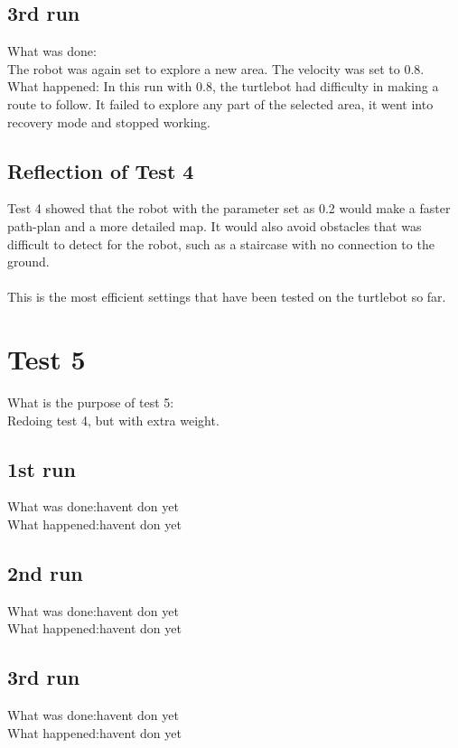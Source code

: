 \subsection{3rd run}
What was done:\\
The robot was again set to explore a new area. The velocity was set to 0.8.
\\
What happened:
In this run with 0.8, the turtlebot had difficulty in making a route to follow. It failed to explore any part of the selected area, it went into recovery mode and stopped working.
\\
\subsection{Reflection of Test 4}

Test 4 showed that the robot with the parameter set as 0.2 would make a faster path-plan and a more detailed map. It would also avoid obstacles that was difficult to detect for the robot, such as a staircase with no connection to the ground.\\ \\
This is the most efficient settings that have been tested on the turtlebot so far.\\

\section{Test 5}%

What is the purpose of test 5: \\
Redoing test 4, but with extra weight.
\subsection{1st run}
What was done:havent don yet
\\
What happened:havent don yet
\\
\subsection{2nd run}
What was done:havent don yet
\\
What happened:havent don yet
\\
\subsection{3rd run}
What was done:havent don yet
\\
What happened:havent don yet

